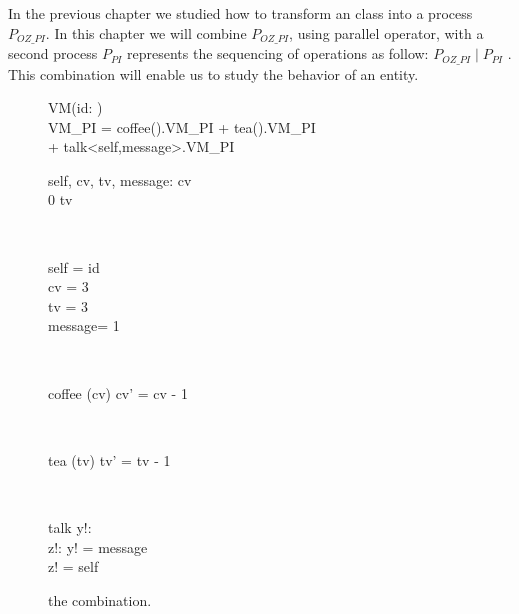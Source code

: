 In the previous chapter we studied how to transform an \oz{} class into a \picalc{} process $P_{OZ\_PI}$. In this chapter we will combine $P_{OZ\_PI}$, using parallel operator, with a second \picalc{} process $P_{PI}$ represents the sequencing of operations as follow: $P_{OZ\_PI} \mid P_{PI}$ . This combination will enable us to study the behavior of an entity.
\begin{figure}[H]
\centering
\begin{class}{VM(id: \integer)}
\ 
\\VM\_PI = coffee().VM\_PI + tea().VM\_PI 
\\ \qquad \qquad \qquad + talk<self,message>.VM\_PI
\\
\begin{state}
self, cv, tv, message: \integer
{} \leq  cv 
\\
0 \leq  tv 
\end{state} 
\\
\begin{init}
self = id
\\cv = 3
\\tv = 3
\\ message= 1
\end{init} 
\\
\begin{op}{coffee}
\Delta (cv)
\ST
cv' = cv - 1
\end{op}
\\
\begin{op}{tea}
\Delta (tv)
\ST
tv' = tv - 1
\end{op}
\\
\begin{op}{talk}
y!: \integer
\\z!: \integer
\ST
y! = message
\\z! = self
\end{op}
\end{class}
\caption{the combination.}
\label{comp_oz_pi}
\end{figure}
